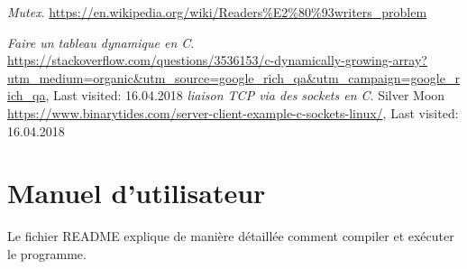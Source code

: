 \documentclass[11pt,a4paper]{article}
\begin{document}
\begin{thebibliography}{20}

\textit{Mutex}.	%
\url{https://en.wikipedia.org/wiki/Readers\%E2\%80\%93writers_problem}

\textit{Faire un tableau dynamique en C}.					    %
\url{https://stackoverflow.com/questions/3536153/c-dynamically-growing-array?utm_medium=organic&utm_source=google_rich_qa&utm_campaign=google_rich_qa},	%
Last visited: 16.04.2018							%
\textit{liaison TCP via des sockets en C}.					    %
Silver Moon
\url{https://www.binarytides.com/server-client-example-c-sockets-linux/},	%
Last visited: 16.04.2018							%
\end{thebibliography}




\appendix 
\renewcommand{\thesubsection}{\Alph{section}.\arabic{subsection}}

\section{Manuel d'utilisateur} \label{app:annexe}
Le fichier README explique de manière détaillée comment compiler et exécuter le programme.


\end{document}
